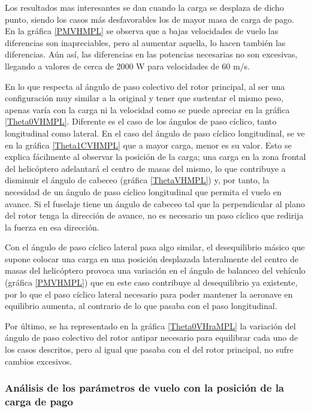 Los resultados mas interesantes se dan cuando la carga se desplaza de dicho punto, siendo los casos más desfavorables los de mayor masa de carga de pago. En la gráfica \ref{PMVHMPL} se observa que a bajas velocidades de vuelo las diferencias son inapreciables, pero al aumentar aquella, lo hacen también las diferencias. Aún así, las diferencias en las potencias necesarias no son excesivas, llegando a valores de cerca de 2000 W para velocidades de 60 m/s.

En lo que respecta al ángulo de paso colectivo del rotor principal, al ser una configuración muy similar a la original y tener que sustentar el mismo peso, apenas varía con la carga ni la velocidad como se puede apreciar en la gráfica \ref{Theta0VHMPL}. Diferente es el caso de los ángulos de paso cíclico, tanto longitudinal como lateral. En el caso del ángulo de paso cíclico longitudinal, se ve en la gráfica \ref{Theta1CVHMPL} que a mayor carga, menor es su valor. Esto se explica fácilmente al observar la posición de la carga; una carga en la zona frontal del helicóptero adelantará el centro de masas del mismo, lo que contribuye a disminuir el ángulo de cabeceo (gráfica \ref{ThetaVHMPL}) y, por tanto, la necesidad de un ángulo de paso cíclico longitudinal que permita el vuelo en avance. Si el fuselaje tiene un ángulo de cabeceo tal que la perpendicular al plano del rotor tenga la dirección de avance, no es necesario un paso cíclico que redirija la fuerza en esa dirección.

Con el ángulo de paso cíclico lateral pasa algo similar, el desequilibrio másico que supone colocar una carga en una posición desplazada lateralmente del centro de masas del helicóptero provoca una variación en el ángulo de balanceo del vehículo (gráfica \ref{PMVHMPL}) que en este caso contribuye al desequilibrio ya existente, por lo que el paso cíclico lateral necesario para poder mantener la aeronave en equilibrio aumenta, al contrario de lo que pasaba con el paso longitudinal.

Por último, se ha representado en la gráfica \ref{Theta0VHraMPL} la variación del ángulo de paso colectivo del rotor antipar necesario para equilibrar cada uno de los casos descritos, pero al igual que pasaba con el del rotor principal, no sufre cambios excesivos.

\subsubsection*{Análisis de los parámetros de vuelo con la posición de la carga de pago}

